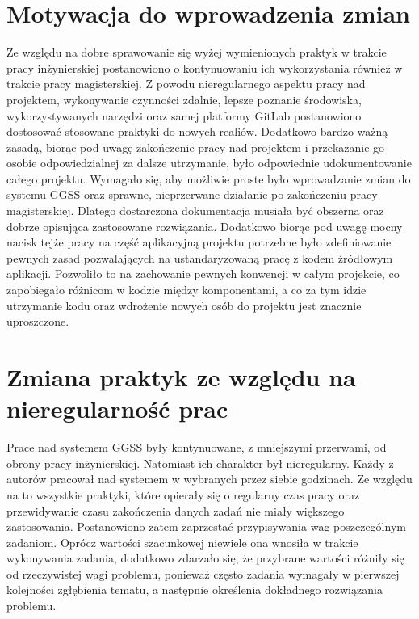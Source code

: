 \section{Motywacja do wprowadzenia zmian}
Ze względu na dobre sprawowanie się wyżej wymienionych praktyk w trakcie pracy inżynierskiej postanowiono o kontynuowaniu ich wykorzystania również w trakcie pracy magisterskiej. Z powodu nieregularnego aspektu pracy nad projektem, wykonywanie czynności zdalnie, lepsze poznanie środowiska, wykorzystywanych narzędzi oraz samej platformy GitLab postanowiono dostosować stosowane praktyki do nowych realiów. Dodatkowo bardzo ważną zasadą, biorąc pod uwagę zakończenie pracy nad projektem i przekazanie go osobie odpowiedzialnej za dalsze utrzymanie, było odpowiednie udokumentowanie całego projektu. Wymagało się, aby możliwie proste było wprowadzanie zmian do systemu GGSS oraz sprawne, nieprzerwane działanie po zakończeniu pracy magisterskiej. Dlatego dostarczona dokumentacja musiała być obszerna oraz dobrze opisująca zastosowane rozwiązania. Dodatkowo biorąc pod uwagę mocny nacisk tejże pracy na część aplikacyjną projektu potrzebne było zdefiniowanie pewnych zasad pozwalających na ustandaryzowaną pracę z kodem źródłowym aplikacji. Pozwoliło to na zachowanie pewnych konwencji w całym projekcie, co zapobiegało różnicom w kodzie między komponentami, a co za tym idzie utrzymanie kodu oraz wdrożenie nowych osób do projektu jest znacznie uproszczone.


\section{Zmiana praktyk ze względu na nieregularność prac}

Prace nad systemem GGSS były kontynuowane, z mniejszymi przerwami, od obrony pracy inżynierskiej. Natomiast ich charakter był nieregularny. Każdy z autorów pracował nad systemem w wybranych przez siebie godzinach. Ze względu na to wszystkie praktyki, które opierały się o regularny czas pracy oraz przewidywanie czasu zakończenia danych zadań nie miały większego zastosowania. Postanowiono zatem zaprzestać przypisywania wag poszczególnym zadaniom. Oprócz wartości szacunkowej niewiele ona wnosiła w trakcie wykonywania zadania, dodatkowo zdarzało się, że przybrane wartości różniły się od rzeczywistej wagi problemu, ponieważ często zadania wymagały w pierwszej kolejności zgłębienia tematu, a następnie określenia dokładnego rozwiązania problemu.

